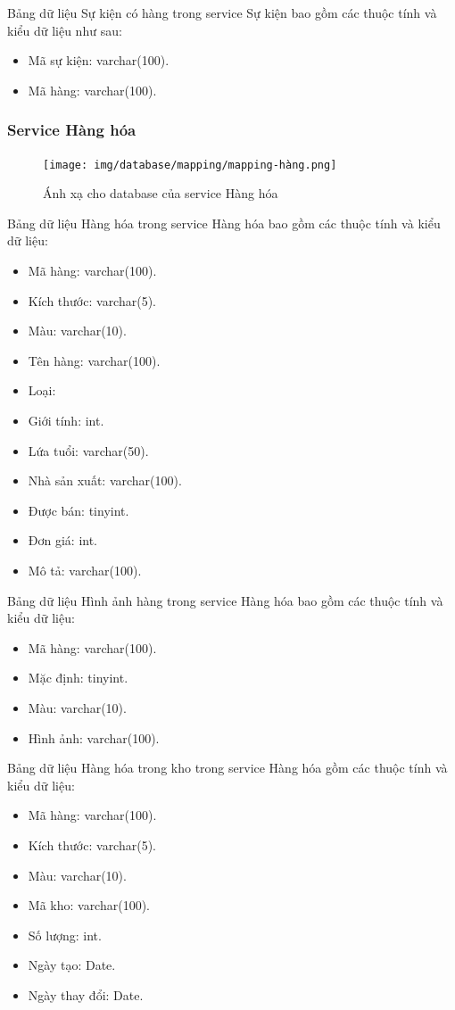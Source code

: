 Bảng dữ liệu Sự kiện có hàng trong service Sự kiện bao gồm các thuộc tính và kiểu dữ liệu như sau:
\begin{itemize}
	\item Mã sự kiện: varchar(100).
	\item Mã hàng: varchar(100).
\end{itemize}

\subsubsection{Service Hàng hóa}
\begin{figure}[!htp]
	\begin{center}
		\texttt{[image: img/database/mapping/mapping-hàng.png]}
		\newline
		\caption{Ánh xạ cho database của service Hàng hóa}
	\end{center}
\end{figure}

Bảng dữ liệu Hàng hóa trong service Hàng hóa bao gồm các thuộc tính và kiểu dữ liệu:
\begin{itemize}
	\item Mã hàng: varchar(100).
	\item Kích thước: varchar(5).
	\item Màu: varchar(10).
	\item Tên hàng: varchar(100).
	\item Loại: 
	\item Giới tính: int.
	\item Lứa tuổi: varchar(50).
	\item Nhà sản xuất: varchar(100).
	\item Được bán: tinyint.
	\item Đơn giá: int.
	\item Mô tả: varchar(100).
\end{itemize}

Bảng dữ liệu Hình ảnh hàng trong service Hàng hóa bao gồm các thuộc tính và kiểu dữ liệu:
\begin{itemize}
	\item Mã hàng: varchar(100).
	\item Mặc định: tinyint.
	\item Màu: varchar(10).
	\item Hình ảnh: varchar(100).
\end{itemize}

Bảng dữ liệu Hàng hóa trong kho trong service Hàng hóa gồm các thuộc tính và kiểu dữ liệu:
\begin{itemize}
	\item Mã hàng: varchar(100).
	\item Kích thước: varchar(5).
	\item Màu: varchar(10).
	\item Mã kho: varchar(100).
	\item Số lượng: int.
	\item Ngày tạo: Date.
	\item Ngày thay đổi: Date.
\end{itemize}

